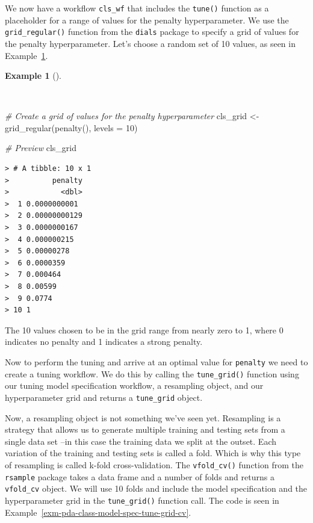 \documentclass[
  letterpaper,
]{latex/krantz}
\newenvironment{Shaded}{\begin{snugshade}}{\end{snugshade}}
\newcommand{\AttributeTok}[1]{\textcolor[rgb]{0.00,0.00,0.00}{#1}}
\newcommand{\CommentTok}[1]{\textcolor[rgb]{0.00,0.00,0.00}{\textit{#1}}}
\newcommand{\DecValTok}[1]{\textcolor[rgb]{0.00,0.00,0.00}{#1}}
\newcommand{\FunctionTok}[1]{\textcolor[rgb]{0.00,0.00,0.00}{#1}}
\newcommand{\NormalTok}[1]{\textcolor[rgb]{0.00,0.00,0.00}{#1}}
\newcommand{\OtherTok}[1]{\textcolor[rgb]{0.00,0.00,0.00}{#1}}
\theoremstyle{definition}
\newtheorem{example}{Example}[chapter]
\theoremstyle{remark}
\begin{document}
We now have a workflow \texttt{cls\_wf} that includes the
\texttt{tune()} function as a placeholder for a range of values for the
penalty hyperparameter. We use the \texttt{grid\_regular()} function
from the \texttt{dials} package to specify a grid of values for the
penalty hyperparameter. Let's choose a random set of 10 values, as seen
in Example~\ref{exm-pda-class-model-spec-tune-grid-values}.

\begin{example}[]\protect\hypertarget{exm-pda-class-model-spec-tune-grid-values}{}\label{exm-pda-class-model-spec-tune-grid-values}

~

\begin{Shaded}
\begin{Highlighting}[]
\CommentTok{\# Create a grid of values for the penalty hyperparameter}
\NormalTok{cls\_grid }\OtherTok{\textless{}{-}}
  \FunctionTok{grid\_regular}\NormalTok{(}\FunctionTok{penalty}\NormalTok{(), }\AttributeTok{levels =} \DecValTok{10}\NormalTok{)}

\CommentTok{\# Preview}
\NormalTok{cls\_grid}
\end{Highlighting}
\end{Shaded}

\begin{verbatim}
> # A tibble: 10 x 1
>          penalty
>            <dbl>
>  1 0.0000000001 
>  2 0.00000000129
>  3 0.0000000167 
>  4 0.000000215  
>  5 0.00000278   
>  6 0.0000359    
>  7 0.000464     
>  8 0.00599      
>  9 0.0774       
> 10 1
\end{verbatim}

\end{example}

The 10 values chosen to be in the grid range from nearly zero to 1,
where 0 indicates no penalty and 1 indicates a strong penalty.

Now to perform the tuning and arrive at an optimal value for
\texttt{penalty} we need to create a tuning workflow. We do this by
calling the \texttt{tune\_grid()} function using our tuning model
specification workflow, a resampling object, and our hyperparameter grid
and returns a \texttt{tune\_grid} object.

Now, a resampling object is not something we've seen yet. Resampling is
a strategy that allows us to generate multiple training and testing sets
from a single data set --in this case the training data we split at the
outset. Each variation of the training and testing sets is called a
fold. Which is why this type of resampling is called k-fold
cross-validation. The \texttt{vfold\_cv()} function from the
\texttt{rsample} package takes a data frame and a number of folds and
returns a \texttt{vfold\_cv} object. We will use 10 folds and include
the model specification and the hyperparameter grid in the
\texttt{tune\_grid()} function call. The code is seen in
Example~\ref{exm-pda-class-model-spec-tune-grid-cv}.
\end{document}
